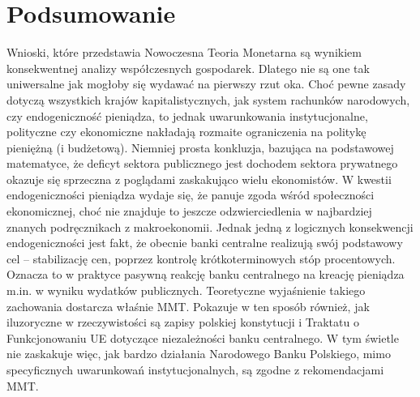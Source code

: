 \documentclass[
]{book}
\begin{document}
\hypertarget{podsumowanie}{%
\section{Podsumowanie}\label{podsumowanie}}

Wnioski, które przedstawia Nowoczesna Teoria Monetarna są wynikiem konsekwentnej analizy współczesnych gospodarek. Dlatego nie są one tak uniwersalne jak mogłoby się wydawać na pierwszy rzut oka. Choć pewne zasady dotyczą wszystkich krajów kapitalistycznych, jak system rachunków narodowych, czy endogeniczność pieniądza, to jednak uwarunkowania instytucjonalne, polityczne czy ekonomiczne nakładają rozmaite ograniczenia na politykę pieniężną (i budżetową). Niemniej prosta konkluzja, bazująca na podstawowej matematyce, że deficyt sektora publicznego jest dochodem sektora prywatnego okazuje się sprzeczna z poglądami zaskakująco wielu ekonomistów. W kwestii endogeniczności pieniądza wydaje się, że panuje zgoda wśród społeczności ekonomicznej, choć nie znajduje to jeszcze odzwierciedlenia w najbardziej znanych podręcznikach z makroekonomii. Jednak jedną z logicznych konsekwencji endogeniczności jest fakt, że obecnie banki centralne realizują swój podstawowy cel -- stabilizację cen, poprzez kontrolę krótkoterminowych stóp procentowych. Oznacza to w praktyce pasywną reakcję banku centralnego na kreację pieniądza m.in. w wyniku wydatków publicznych. Teoretyczne wyjaśnienie takiego zachowania dostarcza właśnie MMT. Pokazuje w ten sposób również, jak iluzoryczne w rzeczywistości są zapisy polskiej konstytucji i Traktatu o Funkcjonowaniu UE dotyczące niezależności banku centralnego.
W tym świetle nie zaskakuje więc, jak bardzo działania Narodowego Banku Polskiego, mimo specyficznych uwarunkowań instytucjonalnych, są zgodne z rekomendacjami MMT.

  
\end{document}
